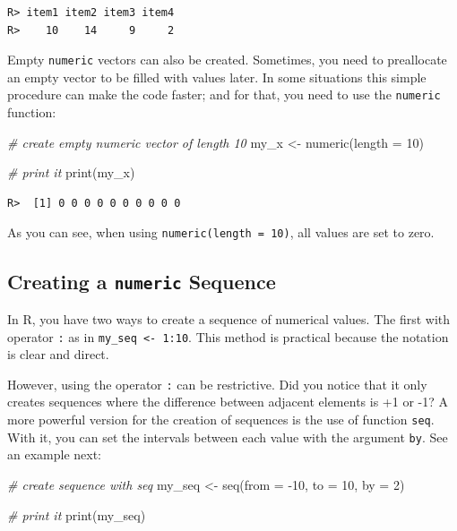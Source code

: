 \documentclass[
  12pt,
]{book}
\newenvironment{Shaded}{\begin{snugshade}}{\end{snugshade}}
\newcommand{\AttributeTok}[1]{\textcolor[rgb]{0.61,0.61,0.61}{#1}}
\newcommand{\CommentTok}[1]{\textcolor[rgb]{0.37,0.37,0.37}{\textit{#1}}}
\newcommand{\DecValTok}[1]{\textcolor[rgb]{0.06,0.06,0.06}{#1}}
\newcommand{\FunctionTok}[1]{\textcolor[rgb]{0,0,0}{#1}}
\newcommand{\NormalTok}[1]{#1}
\newcommand{\OtherTok}[1]{\textcolor[rgb]{0.37,0.37,0.37}{#1}}
\newcommand{\SpecialCharTok}[1]{\textcolor[rgb]{0,0,0}{#1}}
\begin{document}
\begin{verbatim}
R> item1 item2 item3 item4 
R>    10    14     9     2
\end{verbatim}

Empty \texttt{numeric} vectors can also be created. Sometimes, you need to preallocate an empty vector to be filled with values later. In some situations this simple procedure can make the code faster; and for that, you need to use the \texttt{numeric} function: 

\begin{Shaded}
\begin{Highlighting}[]
\CommentTok{\# create empty numeric vector of length 10}
\NormalTok{my\_x }\OtherTok{\textless{}{-}} \FunctionTok{numeric}\NormalTok{(}\AttributeTok{length =} \DecValTok{10}\NormalTok{)}

\CommentTok{\# print it}
\FunctionTok{print}\NormalTok{(my\_x)}
\end{Highlighting}
\end{Shaded}

\begin{verbatim}
R>  [1] 0 0 0 0 0 0 0 0 0 0
\end{verbatim}

As you can see, when using \texttt{numeric(length\ =\ 10)}, all values are set to zero.

\hypertarget{creating-a-numeric-sequence}{%
\subsection{\texorpdfstring{Creating a \texttt{numeric} Sequence}{Creating a numeric Sequence}}\label{creating-a-numeric-sequence}}

In R, you have two ways to create a sequence of numerical values. The first with operator \texttt{:} as in \texttt{my\_seq\ \textless{}-\ 1:10}. This method is practical because the notation is clear and direct.

However, using the operator \texttt{:} can be restrictive. Did you notice that it only creates sequences where the difference between adjacent elements is +1 or -1? A more powerful version for the creation of sequences is the use of function \texttt{seq}. With it, you can set the intervals between each value with the argument \texttt{by}. See an example next: 

\begin{Shaded}
\begin{Highlighting}[]
\CommentTok{\# create sequence with seq}
\NormalTok{my\_seq }\OtherTok{\textless{}{-}} \FunctionTok{seq}\NormalTok{(}\AttributeTok{from =} \SpecialCharTok{{-}}\DecValTok{10}\NormalTok{, }
              \AttributeTok{to =} \DecValTok{10}\NormalTok{, }
              \AttributeTok{by =} \DecValTok{2}\NormalTok{)}

\CommentTok{\# print it}
\FunctionTok{print}\NormalTok{(my\_seq)}
\end{Highlighting}
\end{Shaded}
\end{document}
